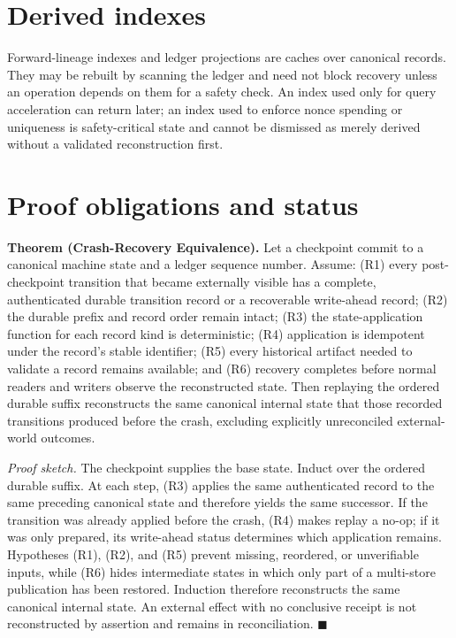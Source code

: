 \documentclass[11pt,openany]{book}
\begin{document}
\section{Derived indexes}
Forward-lineage indexes and ledger projections are caches over canonical
records. They may be rebuilt by scanning the ledger and need not block recovery
unless an operation depends on them for a safety check. An index used only for
query acceleration can return later; an index used to enforce nonce spending
or uniqueness is safety-critical state and cannot be dismissed as merely
derived without a validated reconstruction first.

\section{Proof obligations and status}
\textbf{Theorem (Crash-Recovery Equivalence).} Let a checkpoint commit to a
canonical machine state and a ledger sequence number. Assume: (R1) every
post-checkpoint transition that became externally visible has a complete,
authenticated durable transition record or a recoverable write-ahead record;
(R2) the durable prefix and record order remain intact; (R3) the state-application
function for each record kind is deterministic; (R4) application is idempotent
under the record's stable identifier; (R5) every historical artifact needed to
validate a record remains available; and (R6) recovery completes before normal
readers and writers observe the reconstructed state. Then replaying the ordered
durable suffix reconstructs the same canonical internal state that those
recorded transitions produced before the crash, excluding explicitly
unreconciled external-world outcomes.

\emph{Proof sketch.} The checkpoint supplies the base state. Induct over the
ordered durable suffix. At each step, (R3) applies the same authenticated record
to the same preceding canonical state and therefore yields the same successor.
If the transition was already applied before the crash, (R4) makes replay a
no-op; if it was only prepared, its write-ahead status determines which
application remains. Hypotheses (R1), (R2), and (R5) prevent missing,
reordered, or unverifiable inputs, while (R6) hides intermediate states in
which only part of a multi-store publication has been restored. Induction
therefore reconstructs the same canonical internal state. An external effect
with no conclusive receipt is not reconstructed by assertion and remains in
reconciliation. \(\blacksquare\)
\end{document}
